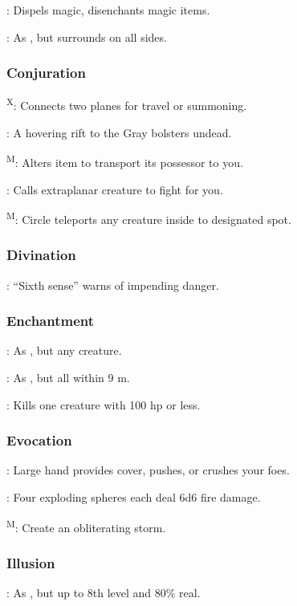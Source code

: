 	: Dispels magic, disenchants magic items.

	: As , but surrounds on all sides.

\subsubsection{Conjuration}
	\textsuperscript{X}: Connects two planes for travel or summoning.

	: A hovering rift to the Gray bolsters undead. %

	\textsuperscript{M}: Alters item to transport its possessor to you.

	: Calls extraplanar creature to fight for you.

	\textsuperscript{M}: Circle teleports any creature inside to designated spot.

\subsubsection{Divination}
	: ``Sixth sense'' warns of impending danger.

\subsubsection{Enchantment}
	: As , but any creature.

	: As , but all within 9 m.

	: Kills one creature with 100 hp or less.

\subsubsection{Evocation}
	: Large hand provides cover, pushes, or crushes your foes.

	: Four exploding spheres each deal 6d6 fire damage.

	\textsuperscript{M}: Create an obliterating storm. %

\subsubsection{Illusion}
	: As , but up to 8th level and 80\% real.

